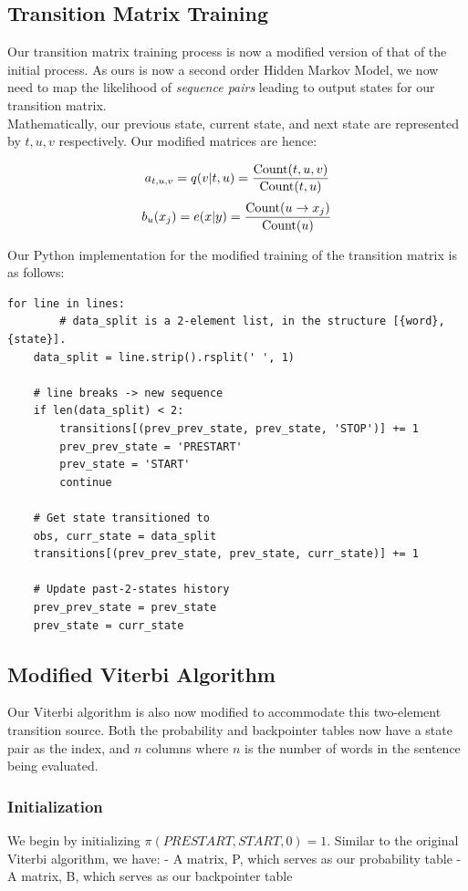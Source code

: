 \documentclass{article}
\numberwithin{equation}{section}
\begin{document}
\subsection{Transition Matrix Training}
Our transition matrix training process is now a modified version of that of the initial process. As ours is now a second order Hidden Markov Model, we now need to map the likelihood of \textit{sequence pairs} leading to output states for our transition matrix.\\

Mathematically, our previous state, current state, and next state are represented by $t, u, v$ respectively. Our modified matrices are hence:

$$ a_{t, u, v} = q(v | t, u) = \frac{\text{\lstinline{Count}}(t, u, v)}{\text{\lstinline{Count}}(t, u)} $$
$$ b_u(x_j) = e(x | y) = \frac{\text{\lstinline{Count}}(u \rightarrow x_j)}{\text{\lstinline{Count}}(u)} $$

Our Python implementation for the modified training of the transition matrix is as follows:

\begin{verbatim}
for line in lines:
		# data_split is a 2-element list, in the structure [{word}, {state}].
    data_split = line.strip().rsplit(' ', 1)

    # line breaks -> new sequence
    if len(data_split) < 2:
        transitions[(prev_prev_state, prev_state, 'STOP')] += 1
        prev_prev_state = 'PRESTART'
        prev_state = 'START'
        continue

    # Get state transitioned to
    obs, curr_state = data_split
    transitions[(prev_prev_state, prev_state, curr_state)] += 1

    # Update past-2-states history
    prev_prev_state = prev_state
    prev_state = curr_state
\end{verbatim}

\subsection{Modified Viterbi Algorithm}

Our Viterbi algorithm is also now modified to accommodate this two-element transition source. Both the probability and backpointer tables now have a state pair as the index, and $n$ columns where $n$ is the number of words in the sentence being evaluated.

\subsubsection{Initialization}
We begin by initializing $\pi(PRESTART,START,0) = 1$.
Similar to the original Viterbi algorithm, we have:
- A matrix, P, which serves as our probability table
- A matrix, B, which serves as our backpointer table
\end{document}
